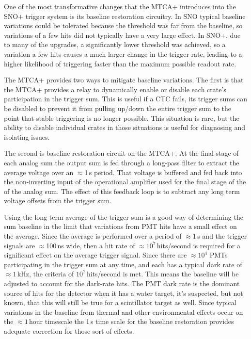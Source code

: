 One of the most transformative changes that the MTCA+ introduces into
the SNO+ trigger system is its baseline restoration circuitry.
In SNO typical baseline variations could be tolerated because
the threshold was far from the baseline, so variations of a few hits
did not typically have a very large effect.
In SNO+, due to many of the upgrades, a significantly lower threshold was achieved,
so a variation a few hits causes a much larger change in the trigger rate,
leading to a higher likelihood of triggering faster than the  maximum possible
readout rate.

The MTCA+ provides two ways to mitigate baseline variations.
The first is that the MTCA+ provides a relay to dynamically enable or disable each
crate's participation in the trigger sum.
This is useful if a CTC fails, its trigger sums can be disabled to prevent it from
pulling up/down the entire trigger sum to the point that stable triggering is no
longer possible.
This situation is rare, but the ability to disable individual
crates in those situations is useful for diagnosing and isolating issues.

The second is baseline restoration circuit on the MTCA+. At the final
stage of each analog sum the output sum is fed through a long-pass
filter to extract the average voltage over an $\approx$1\,s period.
That voltage is buffered and fed back into the non-inverting input
of the operational amplifier used for the final stage of the
of the analog sum.
The effect of this feedback loop is to subtract any long term
voltage offsets from the trigger sum.

Using the long term average of the trigger sum is a good way of
determining the sum baseline in the limit that variations from
PMT hits have a small effect on the average.
Since the average is performed over a period of $\approx$1\,s
and the trigger signals are $\approx$100\,ns wide, then a hit
rate of $\approx 10^7$\,hits/second is required for a significant
effect on the average trigger signal.
Since there are $\approx10^4$ PMTs participating in the trigger sum
at any time, and each has a typical dark rate of $\approx1$\,kHz, the
criteria of $10^7$\,hits/second is met.
This means the baseline will be adjusted to account for the dark-rate hits.
The PMT dark rate is the dominant source of hits for the detector when it has
a water target, it's suspected, but not known, that this will still be true for
a scintillator target as well.
Since typical variations in the baseline from thermal and other environmental
effects occur on the $\approx1$\,hour timescale the 1\,s time scale for the
baseline restoration provides adequate correction for those sort of effects.

